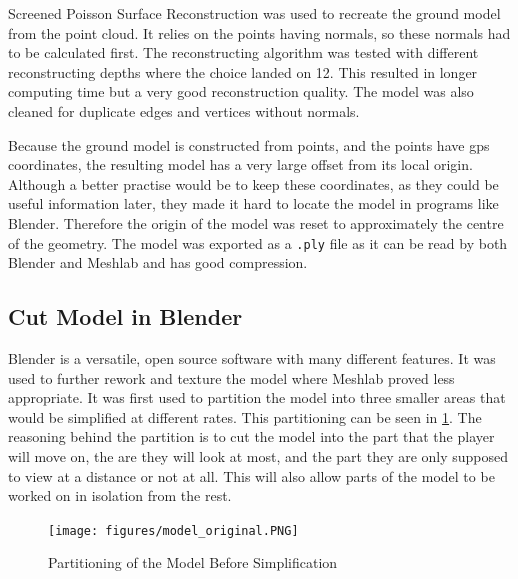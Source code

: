         Screened Poisson Surface Reconstruction\cite{kazhdan2013screened} was used to recreate the ground model from the point cloud. It relies on the points having normals, so these normals had to be calculated first. The reconstructing algorithm was tested with different reconstructing depths where the choice landed on 12. This resulted in longer computing time but a very good reconstruction quality. The model was also cleaned for duplicate edges and vertices without normals.
        
        Because the ground model is constructed from points, and the points have gps coordinates, the resulting model has a very large offset from its local origin. Although a better practise would be to keep these coordinates, as they could be useful information later, they made it hard to locate the model in programs like Blender. Therefore the origin of the model was reset to approximately the centre of the geometry. The model was exported as a \texttt{.ply} file as it can be read by both Blender and Meshlab and has good compression.
    
    \subsection{Cut Model in Blender}
        Blender\cite{blender} is a versatile, open source software with many different features. It was used to further rework and texture the model where Meshlab proved less appropriate. It was first used to partition the model into three smaller areas that would be simplified at different rates. This partitioning can be seen in \cref{fig:model_original}. The reasoning behind the partition is to cut the model into the part that the player will move on, the are they will look at most, and the part they are only supposed to view at a distance or not at all. This will also allow parts of the model to be worked on in isolation from the rest.
        
        \FloatBarrier
        \begin{figure}[htbp]
            \centering
            \texttt{[image: figures/model\_original.PNG]}
            \caption{Partitioning of the Model Before Simplification}
            \label{fig:model_original}
        \end{figure}
        \FloatBarrier
        
    
